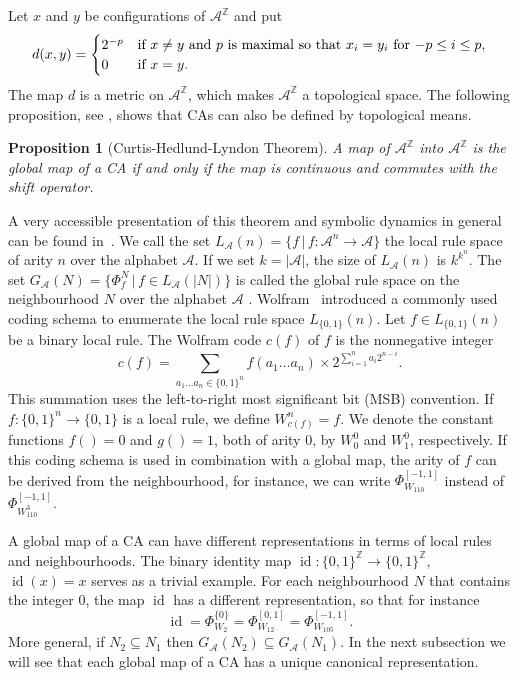 \documentclass[a4paper]{article}
\newcommand{\id}{\mathop{\mathrm{id}}}
\newtheorem{prop}{Proposition}
\begin{document}
Let $x$ and $y$ be configurations of $\mathcal{A}^\mathbb{Z}$ and put
\[
d(x,y) = \begin{cases}
2^{-p} & \text{if $ x \ne y$ and $p$ is maximal so that $x_i = y_i$ for $-p \le i \le p$},\\
0 & \text{if $x = y$}.
\end{cases}
\]
The map $d$ is a metric on $\mathcal{A}^\mathbb{Z}$, which makes
$\mathcal{A}^\mathbb{Z}$ a topological space.
The following proposition, see \cite{DBLP:journals/mst/Hedlund69}, shows that CAs can also be defined by topological means.
\begin{prop}[Curtis-Hedlund-Lyndon Theorem]
A map of $\mathcal{A}^\mathbb{Z}$ into $\mathcal{A}^\mathbb{Z}$ is the global map of a CA if and only if
the map is continuous and commutes with the shift operator.
\end{prop}
A very accessible presentation of this theorem and symbolic dynamics in general can
be found in~\cite{Lind_Marcus_1995}.
We call the set $L_\mathcal{A}(n) = \{f \, | \, f : \mathcal{A}^n \to \mathcal{A} \}$ the local rule space of
arity $n$ over the alphabet $\mathcal{A}$.
If we set $k = |\mathcal{A}|$, the size of $L_{\mathcal{A}}(n)$ is $k^{k^n}$.
The set $G_\mathcal{A}(N) = \{ \Phi^N_f \, | \, f \in L_\mathcal{A}(|N|) \}$ is called the global rule
space on the neighbourhood $N$ over the alphabet $\mathcal{A}$ .
Wolfram~\cite{wolfram-1986} introduced a commonly used coding schema to enumerate the local rule space $L_{\{0,1\}}(n)$.
Let $f \in L_{\{0,1\}}(n)$ be a binary local rule.
The Wolfram code $c(f)$ of $f$ is the nonnegative integer
\[
c(f) = \sum_{a_1\ldots a_{n} \in \{0,1\}^n} f(a_1\ldots a_{n}) \times 2^{\sum_{i=1}^{n} a_i 2^{n-i}}.
\]
This summation uses the left-to-right most significant bit (MSB) convention.
If $f: \{ 0, 1 \}^n \to \{ 0, 1 \} $ is a local rule,
we define $W^n_{c(f)} = f$.
We denote the constant functions $f() = 0$ and $g() = 1$, both of arity 0, by
$W^0_0$ and $W^0_1$, respectively.
If this coding schema is used in combination with a global map, the arity of $f$ can be derived
from the neighbourhood, for instance, we can write
$\Phi^{[-1,1]}_{W_{110}}$ instead of $\Phi^{[-1,1]}_{W^3_{110}}$.

A global map of a CA can have different representations in terms of
local rules and neighbourhoods.
The binary identity map $\id: \{0,1\}^\mathbb{Z} \to \{0,1\}^\mathbb{Z}$,
$\id(x) = x$ serves as a trivial example.
For each neighbourhood $N$ that contains the integer 0,
the map $\id$ has a different representation, so that for instance
\[
\id = \Phi^{\{0\}}_{W_2} = \Phi^{[0,1]}_{W_{12}} = \Phi^{[-1,1]}_{W_{105}}.
\]
More general, if $N_2 \subseteq N_1$ then $G_\mathcal{A}(N_2) \subseteq G_\mathcal{A}(N_1)$.
In the next subsection we will see that each global map of a CA
has a unique canonical representation.
\end{document}
